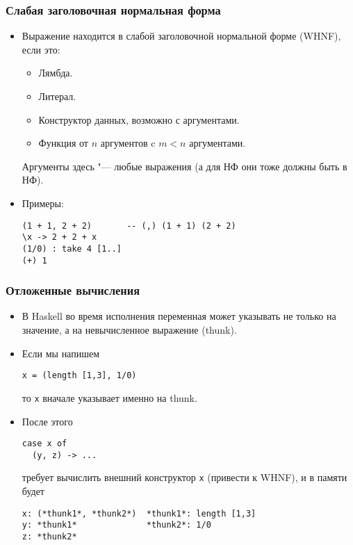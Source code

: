 \documentclass[11pt]{beamer}
\begin{document}
\begin{frame}[fragile]
\frametitle{Слабая заголовочная нормальная форма}
\begin{itemize}
    \item Выражение находится в слабой заголовочной нормальной форме (WHNF), если это:
    \begin{itemize}
        \item Лямбда.
        \item Литерал. 
        \item Конструктор данных, возможно с аргументами.
        \item Функция от $n$ аргументов c $m<n$ аргументами.
    \end{itemize}
    Аргументы здесь "--- любые выражения \pause
    (а для НФ они тоже должны быть в НФ).
    \item Примеры: \pause
\begin{lstlisting}
(1 + 1, 2 + 2)       -- (,) (1 + 1) (2 + 2)
\x -> 2 + 2 + x
(1/0) : take 4 [1..]
(+) 1
\end{lstlisting}
\end{itemize}
\end{frame}

\begin{frame}[fragile]
\frametitle{Отложенные вычисления}
\begin{itemize}
\item В Haskell во время исполнения переменная может указывать не только на значение, а на невычисленное выражение (thunk).
\item Если мы напишем
\begin{lstlisting}[basicstyle=\ttfamily\small]
x = (length [1,3], 1/0)
\end{lstlisting}
то \lstinline|x| вначале указывает именно на thunk.
\item После этого 
\begin{lstlisting}[basicstyle=\ttfamily\small]
case x of
  (y, z) -> ...
\end{lstlisting}
требует вычислить внешний конструктор \lstinline|x| (привести к WHNF), и в памяти будет \pause
\begin{lstlisting}[basicstyle=\ttfamily\small]
x: (*thunk1*, *thunk2*)  *thunk1*: length [1,3]
y: *thunk1*              *thunk2*: 1/0
z: *thunk2*
\end{lstlisting}

\end{itemize}
\end{frame}
\end{document}
